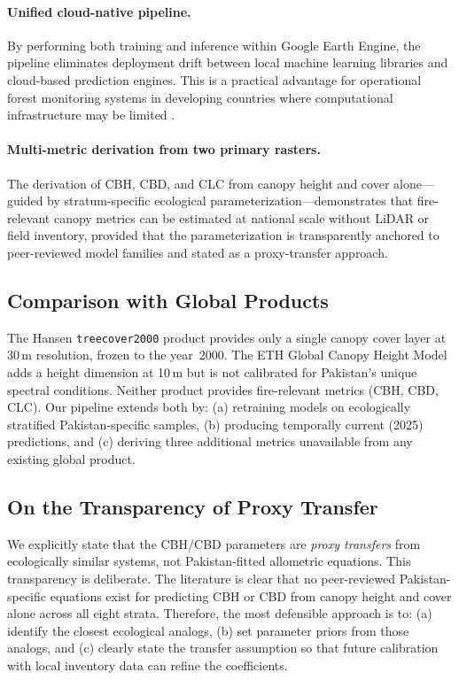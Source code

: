 \documentclass[12pt,a4paper,twoside]{article}
\begin{document}
\paragraph{Unified cloud-native pipeline.}
By performing both training and inference within Google Earth Engine, the pipeline
eliminates deployment drift between local machine learning libraries and cloud-based
prediction engines.  This is a practical advantage for operational forest monitoring
systems in developing countries where computational infrastructure may be limited
\citep{Gorelick2017}.

\paragraph{Multi-metric derivation from two primary rasters.}
The derivation of CBH, CBD, and CLC from canopy height and cover alone---guided by
stratum-specific ecological parameterization---demonstrates that fire-relevant canopy
metrics can be estimated at national scale without LiDAR or field inventory, provided
that the parameterization is transparently anchored to peer-reviewed model families
and stated as a proxy-transfer approach.

\subsection{Comparison with Global Products}

The Hansen \texttt{treecover2000} product provides only a single canopy cover layer
at 30\,m resolution, frozen to the year~2000.  The ETH Global Canopy Height Model
\citep{Lang2023} adds a height dimension at 10\,m but is not calibrated for
Pakistan's unique spectral conditions.  Neither product provides fire-relevant
metrics (CBH, CBD, CLC).  Our pipeline extends both by: (a) retraining models on
ecologically stratified Pakistan-specific samples, (b) producing temporally current
(2025) predictions, and (c) deriving three additional metrics unavailable from any
existing global product.

\subsection{On the Transparency of Proxy Transfer}

We explicitly state that the CBH/CBD parameters are \textit{proxy transfers}
from ecologically similar systems, not Pakistan-fitted allometric equations.  This
transparency is deliberate.  The literature is clear that no peer-reviewed
Pakistan-specific equations exist for predicting CBH or CBD from canopy height and
cover alone across all eight strata.  Therefore, the most defensible approach is to:
(a) identify the closest ecological analogs, (b) set parameter priors from those
analogs, and (c) clearly state the transfer assumption so that future calibration
with local inventory data can refine the coefficients.
\end{document}
